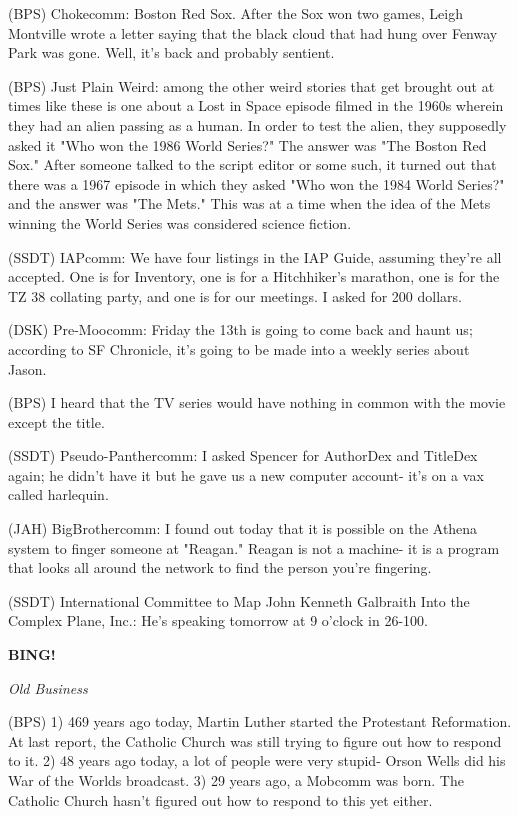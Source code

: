 \documentclass[12pt]{article}
\newcommand{\bing}{{\bf BING!} }
\newcommand{\goto}[1]{\bing \vskip 12pt \centerline{{\em{#1}}}}
\begin{document}
(BPS) Chokecomm: Boston Red Sox. After the Sox won two games, Leigh Montville wrote a letter saying that the black cloud that had hung over Fenway Park was gone. Well, it's back and probably sentient.

(BPS) Just Plain Weird: among the other weird stories that get brought out at times like these is one about a Lost in Space episode filmed in the 1960s wherein they had an alien passing as a human. In order to test the alien, they supposedly asked it "Who won the 1986 World Series?" The answer was "The Boston Red Sox." After someone talked to the script editor or some such, it turned out that there was a 1967 episode in which they asked "Who won the 1984 World Series?" and the answer was "The Mets." This was at a time when the idea of the Mets winning the World Series was considered science fiction.

(SSDT) IAPcomm: We have four listings in the IAP Guide, assuming they're all accepted. One is for Inventory, one is for a Hitchhiker's marathon, one is for the TZ 38 collating party, and one is for our meetings. I asked for 200 dollars.

(DSK) Pre-Moocomm: Friday the 13th is going to come back and haunt us; according to SF Chronicle, it's going to be made into a weekly series about Jason.

(BPS) I heard that the TV series would have nothing in common with the movie except the title.

(SSDT) Pseudo-Panthercomm: I asked Spencer for AuthorDex and TitleDex again; he didn't have it but he gave us a new computer account- it's on a vax called harlequin.

(JAH) BigBrothercomm: I found out today that it is possible on the Athena system to finger someone at "Reagan." Reagan is not a machine- it is a program that looks all around the network to find the person you're fingering.

(SSDT) International Committee to Map John Kenneth Galbraith Into the Complex Plane, Inc.: He's speaking tomorrow at 9 o'clock in 26-100.

\goto{Old Business}

(BPS) 1) 469 years ago today, Martin Luther started the Protestant Reformation. At last report, the Catholic Church was still trying to figure out how to respond to it. 2) 48 years ago today, a lot of people were very stupid- Orson Wells did his War of the Worlds broadcast. 3) 29 years ago, a Mobcomm was born. The Catholic Church hasn't figured out how to respond to this yet either.
\end{document}
